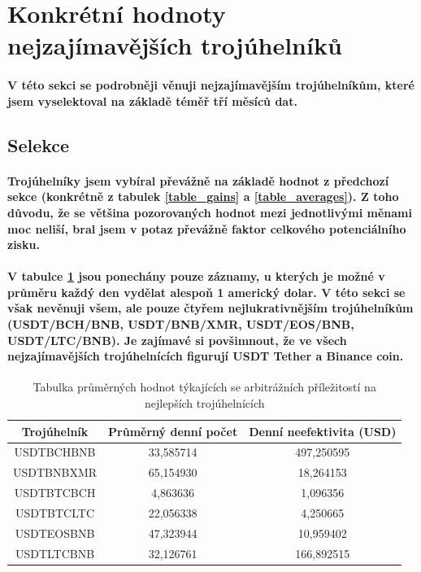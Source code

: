 \documentclass[thesis=B,czech]{FITthesis}[2019/03/21]
\begin{document}
\section{Konkrétní hodnoty nejzajímavějších trojúhelníků}
\paragraph{
V této sekci se podrobněji věnuji nejzajímavějším trojúhelníkům, které jsem vyselektoval na základě téměř tří měsíců dat. 
}
\subsection{Selekce}
\paragraph{
Trojúhelníky jsem vybíral převážně na základě hodnot z předchozí sekce (konkrétně z tabulek \ref{table_gains} a \ref{table_averages}). Z toho důvodu, že se většina pozorovaných hodnot mezi jednotlivými měnami moc neliší, bral jsem v potaz převážně faktor celkového potenciálního zisku.
}
\paragraph{
V tabulce \ref{table_combined_best} jsou ponechány pouze záznamy, u kterých je možné v průměru každý den vydělat alespoň 1 americký dolar. V této sekci se však nevěnuji všem, ale pouze čtyřem nejlukrativnějším trojúhelníkům (USDT/BCH/BNB, USDT/BNB/XMR, USDT/EOS/BNB, USDT/LTC/BNB).
Je zajímavé si povšimnout, že ve všech nejzajímavějších trojúhelnících figurují USDT Tether a Binance coin.
}

\begin{table}\centering
\caption{Tabulka průměrných hodnot týkajících se arbitrážních příležitostí na nejlepších trojúhelnících}
\label{table_combined_best}
\begin{tabular}{|| c | c | c ||}\hline Trojúhelník & Průměrný denní počet & Denní neefektivita (USD)\\ [0.5ex]
 \hline\hline USDTBCHBNB & 33,585714 & 497,250595\\ 
 \hline USDTBNBXMR & 65,154930 & 18,264153\\ 
 \hline USDTBTCBCH & 4,863636 & 1,096356\\ 
 \hline USDTBTCLTC & 22,056338 & 4,250665\\ 
 \hline USDTEOSBNB & 47,323944 & 10,959402\\ 
 \hline USDTLTCBNB & 32,126761 & 166,892515\\ 
 \hline
\end{tabular}
\end{table}
\end{document}
